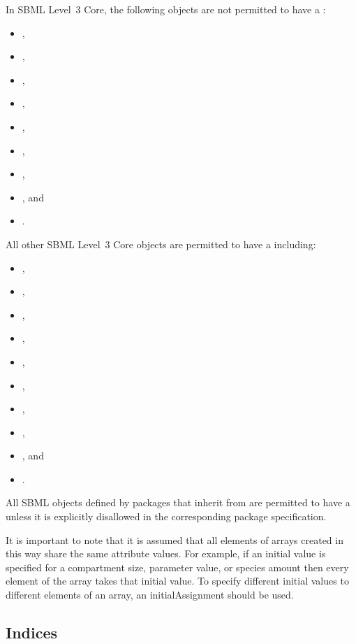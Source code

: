 In SBML Level~3 Core, the following objects are not permitted to have a \ListOfDimensions:
\begin{itemize}
\item {}, 
\item {}, 
\item {}, 
\item {}, 
\item {}, 
\item {}, 
\item {}, 
\item {}, and 
\item {}.
\end{itemize}
All other SBML Level~3 Core objects are permitted to have a \ListOfDimensions including:
\begin{itemize}
\item {},
\item {},
\item {},
\item {},
\item {},
\item {},
\item {},
\item {},
\item {}, and
\item {}.  
\end{itemize}
All SBML objects defined by packages that inherit from \SBase are permitted to have a \ListOfDimensions unless it is explicitly disallowed in the corresponding package specification. 

It is important to note that it is assumed that all elements of arrays created in this way share the same attribute values.  For example, if an initial value is specified for a compartment size, parameter value, or species amount then every element of the array takes that initial value.  To specify different initial values to different elements of an array, an initialAssignment should be used. 

\subsection{Indices}
\label{sec:index}

